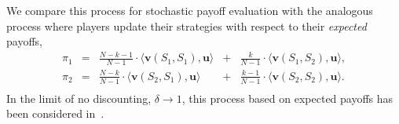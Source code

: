 \documentclass[11pt]{article}
\theoremstyle{plainCl1}
\theoremstyle{plainCl2}
\begin{document}
We compare this process for stochastic payoff evaluation with the analogous process where players update their strategies with respect to their {\it expected} payoffs,
\begin{equation} \label{Eq:ExpPay}
\begin{array}{lcrcr}
\displaystyle \pi_1	&=	&\displaystyle \frac{N\!-\!k\!-\!1}{N-1}\cdot \langle\mathbf{v}(S_1,S_1),\mathbf{u}\rangle	&+	&\displaystyle\frac{k}{N-1}\cdot \langle\mathbf{v}(S_1,S_2),\mathbf{u}\rangle,\\[0.5cm]
\displaystyle \pi_2	&=	&\displaystyle\frac{N-k}{N-1}\cdot \langle\mathbf{v}(S_2,S_1),\mathbf{u}\rangle&+	&\displaystyle\frac{k-1}{N-1}\cdot \langle\mathbf{v}(S_2,S_2),\mathbf{u}\rangle.\\
\end{array}
\end{equation}
In the limit of no discounting, $\delta\!\rightarrow\! 1$, this process based on expected payoffs has been considered in~\cite{imhof:prsb:2010}. 
\end{document}
